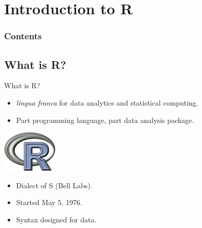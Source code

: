 \section[Intro to R]{Introduction to R}

\hidenum
\begin{frame}[noframenumbering]
\frametitle{Contents}
 \tableofcontents[currentsection,hideothersubsections,sectionstyle=show/hide]
\end{frame}
\shownum

\subsection{What is R?}


\begin{frame}
  \begin{block}{What is R?}\pause
  \begin{minipage}{.75\textwidth}
  \begin{itemize}[<+-|alert@+>]
    \item \emph{lingua franca} for data analytics and statistical computing.
    \item Part programming language, part data analysis package.
  \end{itemize}
  \end{minipage}
  \hfill
  \begin{minipage}{.2\textwidth}
    \centering\includegraphics[scale=2]{../common/pics/Rlogo}
  \end{minipage}
  \begin{itemize}
    \item Dialect of S (Bell Labs).
    \item Started May 5, 1976.
    \item Syntax designed for data.
  \end{itemize}
\end{block}
\end{frame}

